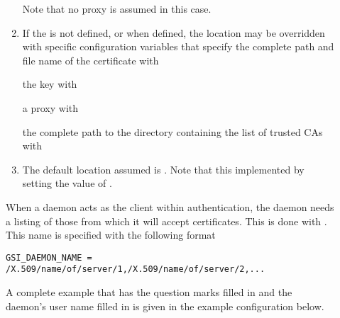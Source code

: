\begin{description}
\begin{enumerate}
\normalsize
Note that no proxy is assumed in this case.
\item
If the  is not defined, 
or when defined,
the location may be overridden with specific configuration
variables that specify the complete path and file name of 
the certificate with
the key with
a proxy with
the complete path to the directory containing the list of trusted CAs with 
\item
The default location assumed is .
Note that this implemented by setting the value of  
.
\end{enumerate}

When a daemon acts as the client within authentication,
the daemon needs a listing of those from which it
will accept certificates.
This is done with .
This name is specified with the following format
\footnotesize
\begin{verbatim}
GSI_DAEMON_NAME = /X.509/name/of/server/1,/X.509/name/of/server/2,...
\end{verbatim}
\normalsize

A complete example that has the question marks filled in and the
daemon's user name filled in is given in the 
example configuration below.


\end{description}

